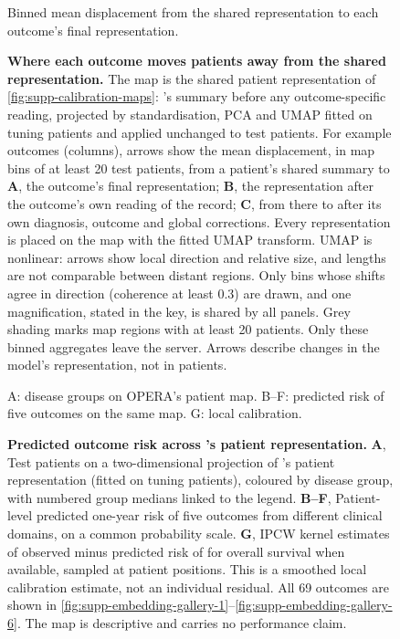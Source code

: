 \begin{figure}[p]
    {Binned mean displacement from the shared representation to each outcome's
    final representation.}
  \caption{\textbf{Where each outcome moves patients away from the shared
  representation.} The map is the shared patient representation of
  \cref{fig:supp-calibration-maps}: \opera{}'s summary before any
  outcome-specific reading, projected by standardisation, PCA and UMAP fitted on
  tuning patients and applied unchanged to test patients. For example outcomes
  (columns), arrows show the mean displacement, in map bins of at least 20 test
  patients, from a patient's shared summary to \textbf{A}, the outcome's final
  representation; \textbf{B}, the representation after the outcome's own
  reading of the record; \textbf{C}, from there to after its own diagnosis,
  outcome and global corrections. Every representation is placed on the map
  with the fitted UMAP transform. UMAP is nonlinear: arrows show local direction
  and relative size, and lengths are not comparable between distant regions.
  Only bins whose shifts agree in direction (coherence at least 0.3) are drawn,
  and one magnification, stated in the key, is shared by all panels. Grey
  shading marks map regions with at least 20 patients. Only these binned
  aggregates leave the server. Arrows describe changes in the model's
  representation, not in patients.}
  \label{fig:supp-correction-arrows}
\end{figure}

\begin{figure}[p]
    {A: disease groups on OPERA's patient map. B--F: predicted risk of
    five outcomes on the same map. G: local calibration.}
  \caption{\textbf{Predicted outcome risk across \opera{}'s patient
  representation.} \textbf{A}, Test
  patients on a two-dimensional projection of \opera{}'s patient
  representation (fitted on tuning patients), coloured by disease group, with
  numbered group medians linked to the legend.
  \textbf{B--F}, Patient-level predicted one-year risk of five outcomes from
  different clinical domains, on a common probability scale.
  \textbf{G}, IPCW kernel estimates of observed minus
  predicted risk of \opera{} for overall survival when available, sampled at
  patient positions. This is a smoothed local calibration estimate, not an
  individual residual. All 69
  outcomes are shown in \cref{fig:supp-embedding-gallery-1}--\cref{fig:supp-embedding-gallery-6}.
  The map is descriptive and carries no performance claim.}
  \label{fig:patient-map}
\end{figure}

